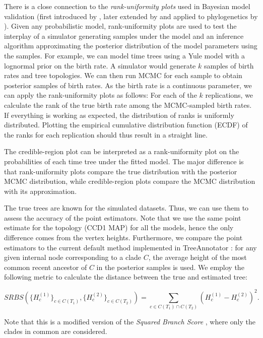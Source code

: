 \documentclass[10pt,letterpaper]{article}
\begin{document}
There is a close connection to the \emph{rank-uniformity plots} used in Bayesian model validation (first introduced by \cite{cook2006validation}, later extended by \cite{talts2018validating} and applied to phylogenetics by \cite{bayesianmodelvalidation}). Given any probabilistic model, rank-uniformity plots are used to test the interplay of a simulator generating samples under the model and an inference algorithm approximating the posterior distribution of the model parameters using the samples. For example, we can model time trees using a Yule model with a lognormal prior on the birth rate. A simulator would generate $k$ samples of birth rates and tree topologies. We can then run MCMC for each sample to obtain posterior samples of birth rates. As the birth rate is a continuous parameter, we can apply the rank-uniformity plots as follows: For each of the $k$ replications, we calculate the rank of the true birth rate among the MCMC-sampled birth rates. If everything is working as expected, the distribution of ranks is uniformly distributed. Plotting the empirical cumulative distribution function (ECDF) of the ranks for each replication should thus result in a straight line.

The credible-region plot can be interpreted as a rank-uniformity plot on the probabilities of each time tree under the fitted model. The major difference is that rank-uniformity plots compare the true distribution with the posterior MCMC distribution, while credible-region plots compare the MCMC distribution with its approximation. 

The true trees are known for the simulated datasets. Thus, we can use them to assess the accuracy of the point estimators. Note that we use the same point estimate for the topology (CCD1 MAP) for all the models, hence the only difference comes from the vertex heights. Furthermore, we compare the point estimators to the current default method implemented in TreeAnnotator \cite{treeannotator}: for any given internal node corresponding to a clade $C$, the average height of the most common recent ancestor of $C$ in the posterior samples is used. We employ the following metric to calculate the distance between the true and estimated tree:

$$
SRBS\left(\{H^{(1)}_c\}_{c \in C(T_1)}, \{H^{(2)}_c\}_{c \in C(T_2)}\right) = \sum_{c \in C(T_1) \cap C(T_2)} \left(H^{(1)}_c-H^{(2)}_c\right)^2 .
$$

Note that this is a modified version of the \emph{Squared Branch Score} \cite{treesinforest}, where only the clades in common are considered.
\end{document}
